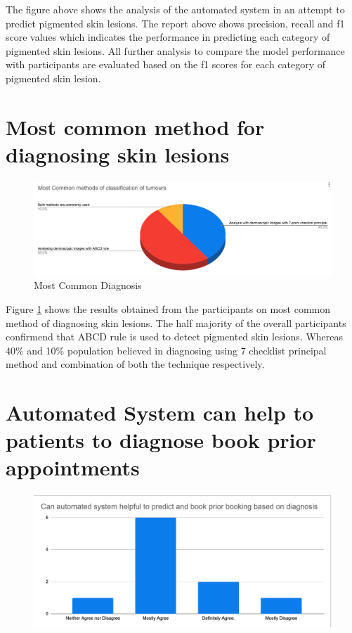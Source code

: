 The figure above shows the analysis of the automated system in an attempt to predict pigmented skin lesions. The report above shows precision, recall and f1 score values which indicates the performance in predicting each category of pigmented skin lesions. All further analysis to compare the model performance with participants are evaluated based on the f1 scores for each category of pigmented skin lesion.
\pagebreak

\section{Most common method for diagnosing skin lesions}
\begin{figure}[!htp]
    \includegraphics[width=15cm]{Images/dia.png}
    \caption{Most Common Diagnosis}
    \label{fig:commonPigmentedSkinLesions}
\end{figure}

Figure \ref{fig:commonPigmentedSkinLesions} shows the results obtained from the 
participants on most common method of diagnosing skin lesions. The half majority of the 
overall participants confirmend that ABCD rule is used to detect pigmented skin lesions. 
Whereas 40\% and 10\% population believed in diagnosing using 7 checklist principal 
method and combination of both the technique respectively.  
\section{Automated System can help to patients to diagnose book prior appointments}
\begin{figure}[!htp]
    \includegraphics[width=\textwidth]{Images/help.png}
    \label{fig:help}
\end{figure}

